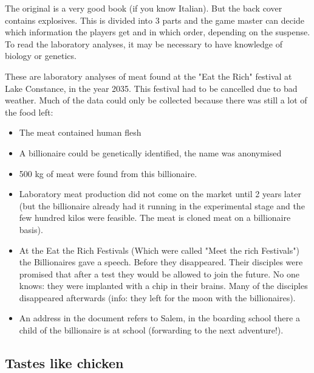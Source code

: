 The original is a very good book (if you know Italian). But the back cover contains explosives.
This is divided into 3 parts and the game master can decide which information the players get and in which order, depending on the suspense.
To read the laboratory analyses, it may be necessary to have knowledge of biology or genetics.

These are laboratory analyses of meat found at the "Eat the Rich" festival at Lake Constance, in the year 2035. This festival had to be cancelled due to bad weather. Much of the data could only be collected because there was still a lot of the food left:

\begin{itemize}
    \item The meat contained human flesh
    \item A billionaire could be genetically identified, the name was anonymised
    \item 500 kg of meat were found from this billionaire.
    \item Laboratory meat production did not come on the market until 2 years later (but the billionaire already had it running in the experimental stage and the few hundred kilos were feasible. The meat is cloned meat on a billionaire basis).
    \item At the Eat the Rich Festivals (Which were called "Meet the rich Festivals") the Billionaires gave a speech. Before they disappeared. Their disciples were promised that after a test they would be allowed to join the future. No one knows: they were implanted with a chip in their brains. Many of the disciples disappeared afterwards (info: they left for the moon with the billionaires).
    \item An address in the document refers to Salem, in the boarding school there a child of the billionaire is at school (forwarding to the next adventure!).
\end{itemize}


\subsection{Tastes like chicken}

